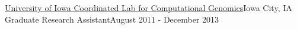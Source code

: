 \resumePosition
    {\href{http://genome.uiowa.edu/clcg/}{University of Iowa Coordinated Lab for Computational Genomics}}{Iowa City, IA}
    {Graduate Research Assistant}{August 2011 - December 2013}
\resumeItemListStart
\resumeItemListEnd